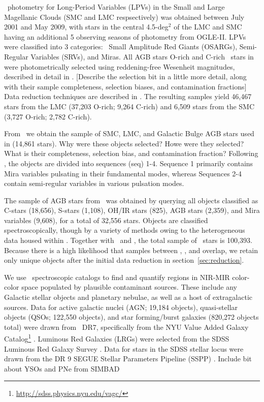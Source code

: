 \ogle\, photometry for Long-Period Variables (LPVs) in the Small and Large Magellanic Clouds (SMC and LMC respsectively) was obtained between July 2001 and May 2009, with stars in the central 4.5-deg$^2$ of the LMC and SMC having an additional 5 observing seasons of photometry from OGLE-II. LPVs were classified into 3 categories: \ogle\, Small Amplitude Red Giants (OSARGs), Semi-Regular Variables (SRVs), and Miras. All AGB stars  O-rich and C-rich \agb\, stars in \ogle\, were photometrically selected using reddening-free Wesenheit magnitudes, described in detail in \cite{2009AcA....59..239S,2011AcA....61..217S}. {\color{red}[Describe the selection bit in a little more detail, along with their sample completeness, selection biases, and contamination fractions]} Data reduction techniques are described in \cite{2008AcA....58...69U}. The resulting samples yield 46,467 \agb\, stars from the LMC (37,203 O-rich; 9,264 C-rich) and 6,509 stars from the SMC (3,727 O-rich; 2,782 C-rich). 

From \macho\, we obtain the sample of SMC, LMC, and Galactic Bulge AGB stars used in \cite{2008AJ....136.1242F} (14,861 stars). {\color{red}Why were these objects selected? Howe were they selected? What is their completeness, selection bias, and contamination fraction?} Following \cite{2008AJ....136.1242F}, the objects are divided into sequences (seq) 1-4. Sequence 1 primarily contains Mira variables pulsating in their fundamental modes, whereas Sequences 2-4 contain semi-regular variables in various pulsation modes.

The sample of AGB stars from \simbad\, was obtained by querying all objects classified as C-stars (18,656), S-stars (1,108), OH/IR stars (825), AGB stars (2,359), and Mira variables (9,608), for a total of 32,556 stars. Objects are classified spectroscopically, though by a variety of methods owing to the heterogeneous data housed within \simbad. Together with \macho\, and \ogle, the total sample of \agb\, stars is 100,393. Because there is a high likelihood that samples between \ogle, \macho, and \simbad overlap, we retain only unique objects after the initial data reduction in section~\ref{sec:reduction}.

We use \sdss\, spectroscopic catalogs to find and quantify regions in NIR-MIR color-color space populated by plausible contaminant sources. These include any Galactic stellar objects and planetary nebulae, as well as a host of extragalactic sources. Data for active galactic nuclei (AGN; 19,184 objects), quasi-stellar objects (QSOs; 122,550 objects), and star forming/burst galaxies (820,272 objects total) were drawn from \sdss\, DR7, specifically from the NYU Value Added Galaxy Catalog\footnote{\url{http://sdss.physics.nyu.edu/vagc/}} \citep[VAGC]{2005AJ....129.2562B}. Luminous Red Galaxies (LRGs) were selected from the SDSS Luminous Red Galaxy Survey \citep[105,631 objects, ][]{2010ApJ...710.1444K}.  Data for stars in the SDSS stellar locus were drawn from the DR 9 SEGUE Stellar Parameters Pipeline (SSPP) \citep[1,843,190 objects, ][]{2012ApJS..203...21A}. {\color{red} Include bit about YSOs and PNe from SIMBAD}


